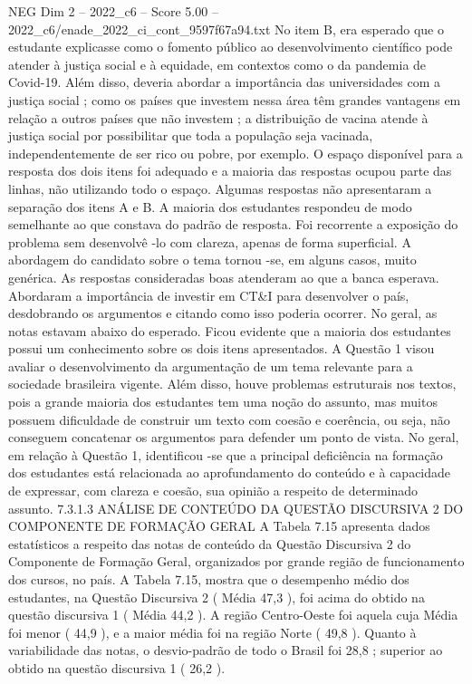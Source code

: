 \begin{textsample}{NEG Dim 2 – 2022\_c6 – Score 5.00 – 2022\_c6/enade\_2022\_ci\_cont\_9597f67a94.txt}
No item B, era esperado que o estudante explicasse como o fomento público ao desenvolvimento científico pode atender à justiça social e à equidade, em contextos como o da pandemia de Covid-19.
Além disso, deveria abordar a importância das universidades com a justiça social ; como os países que investem nessa área têm grandes vantagens em relação a outros países que não investem ; a distribuição de vacina atende à justiça social por possibilitar que toda a população seja vacinada, independentemente de ser rico ou pobre, por exemplo.
O espaço disponível para a resposta dos dois itens foi adequado e a maioria das respostas ocupou parte das linhas, não utilizando todo o espaço.
Algumas respostas não apresentaram a separação dos itens A e B.
A maioria dos estudantes respondeu de modo semelhante ao que constava do padrão de resposta.
Foi recorrente a exposição do problema sem desenvolvê -lo com clareza, apenas de forma superficial.
A abordagem do candidato sobre o tema tornou -se, em alguns casos, muito genérica.
As respostas consideradas boas atenderam ao que a banca esperava.
Abordaram a importância de investir em CT\&I para desenvolver o país, desdobrando os argumentos e citando como isso poderia ocorrer.
No geral, as notas estavam abaixo do esperado.
Ficou evidente que a maioria dos estudantes possui um conhecimento sobre os dois itens apresentados.
A Questão 1 visou avaliar o desenvolvimento da argumentação de um tema relevante para a sociedade brasileira vigente.
Além disso, houve problemas estruturais nos textos, pois a grande maioria dos estudantes tem uma noção do assunto, mas muitos possuem dificuldade de construir um texto com coesão e coerência, ou seja, não conseguem concatenar os argumentos para defender um ponto de vista.
No geral, em relação à Questão 1, identificou -se que a principal deficiência na formação dos estudantes está relacionada ao aprofundamento do conteúdo e à capacidade de expressar, com clareza e coesão, sua opinião a respeito de determinado assunto. 7.3.1.3 ANÁLISE DE CONTEÚDO DA QUESTÃO DISCURSIVA 2 DO COMPONENTE DE FORMAÇÃO GERAL A Tabela 7.15 apresenta dados estatísticos a respeito das notas de conteúdo da Questão Discursiva 2 do Componente de Formação Geral, organizados por grande região de funcionamento dos cursos, no país.
A Tabela 7.15, mostra que o desempenho médio dos estudantes, na Questão Discursiva 2 ( Média 47,3 ), foi acima do obtido na questão discursiva 1 ( Média 44,2 ).
A região Centro-Oeste foi aquela cuja Média foi menor ( 44,9 ), e a maior média foi na região Norte ( 49,8 ).
Quanto à variabilidade das notas, o desvio-padrão de todo o Brasil foi 28,8 ; superior ao obtido na questão discursiva 1 ( 26,2 ).

\end{textsample}
